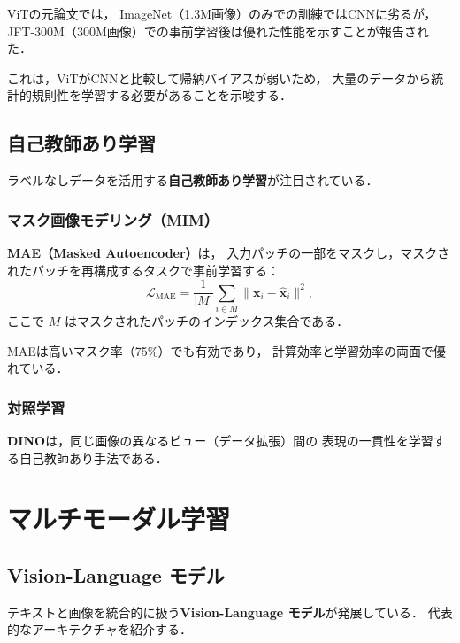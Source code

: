 ViTの元論文\cite{Dosovitskiy2020}では，
ImageNet（1.3M画像）のみでの訓練ではCNNに劣るが，
JFT-300M（300M画像）での事前学習後は優れた性能を示すことが報告された．

これは，ViTがCNNと比較して帰納バイアスが弱いため，
大量のデータから統計的規則性を学習する必要があることを示唆する．

\subsection{自己教師あり学習}

ラベルなしデータを活用する\textbf{自己教師あり学習}が注目されている．

\subsubsection{マスク画像モデリング（MIM）}

\textbf{MAE（Masked Autoencoder）}\cite{He2022}は，
入力パッチの一部をマスクし，マスクされたパッチを再構成するタスクで事前学習する：
\begin{equation}
  \mathcal{L}_{\mathrm{MAE}} = \frac{1}{|M|} \sum_{i \in M} \|\boldsymbol{x}_i - \hat{\boldsymbol{x}}_i\|^2,
\end{equation}
ここで $M$ はマスクされたパッチのインデックス集合である．

MAEは高いマスク率（75\%）でも有効であり，
計算効率と学習効率の両面で優れている．

\subsubsection{対照学習}

\textbf{DINO}\cite{Caron2021}は，同じ画像の異なるビュー（データ拡張）間の
表現の一貫性を学習する自己教師あり手法である．

\section{マルチモーダル学習}
\label{sec:multimodal}

\subsection{Vision-Language モデル}

テキストと画像を統合的に扱う\textbf{Vision-Language モデル}が発展している．
代表的なアーキテクチャを紹介する．

